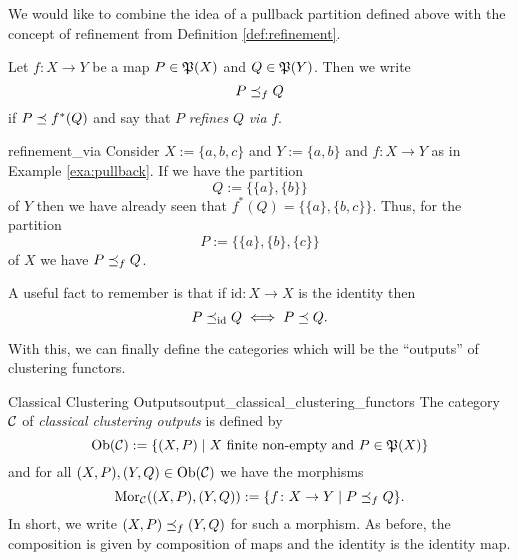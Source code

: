 We would like to combine the idea of a pullback partition defined above with the concept of refinement from Definition \ref{def:refinement}.

\begin{definition}{}{}
Let $f \colon X \to Y$ be a map $P \in \P(X)$ and $Q \in \P(Y)$. Then we write
$$
P \refines_f Q
$$
if $P \refines f^*(Q)$ and say that $P$ \emph{refines} $Q$ \emph{via} $f$.
\end{definition}

\begin{example}{}{refinement_via}
Consider $X := \{a,b,c\}$ and $Y := \{a,b\}$ and $f\colon X \to Y$ as in Example \ref{exa:pullback}. If we have the partition 
$$
Q := \{\{a\}, \{b\}\}
$$
of $Y$ then we have already seen that $f^*(Q) = \{\{a\}, \{b,c\}\}$. Thus, for the partition
$$
P := \{\{a\}, \{b\}, \{c\}\}
$$
of $X$ we have $P \refines_f Q$.
\end{example}

A useful fact to remember is that if $\mathrm{id}\colon X \to X$ is the identity then
\begin{equation}
    \label{eq:refinement_via_identity}
    P \refines_{\mathrm{id}} Q \iff P \refines Q.
\end{equation}

With this, we can finally define the categories which will be the ``outputs'' of clustering functors.

\begin{definition}{Classical Clustering Outputs\cite[Def.~3.2]{Carlsson2010}}{output_classical_clustering_functors}
The category $\C$ of \emph{classical clustering outputs} is defined by
\begin{equation*}
    \ob(\C) := \{(X, P)\mid X \text{ finite non-empty and } P \in \P(X)\}
\end{equation*}
and for all $(X,P), (Y,Q) \in \ob(\C)$ we have the morphisms
\begin{equation*}
    \mor_\C((X,P), (Y,Q)) := \{f\colon X \to Y\mid P \refines_f Q\}.
\end{equation*}
In short, we write $(X,P) \refines_f (Y,Q)$ for such a morphism. As before, the composition is given by composition of maps and the identity is the identity map.
\end{definition}

